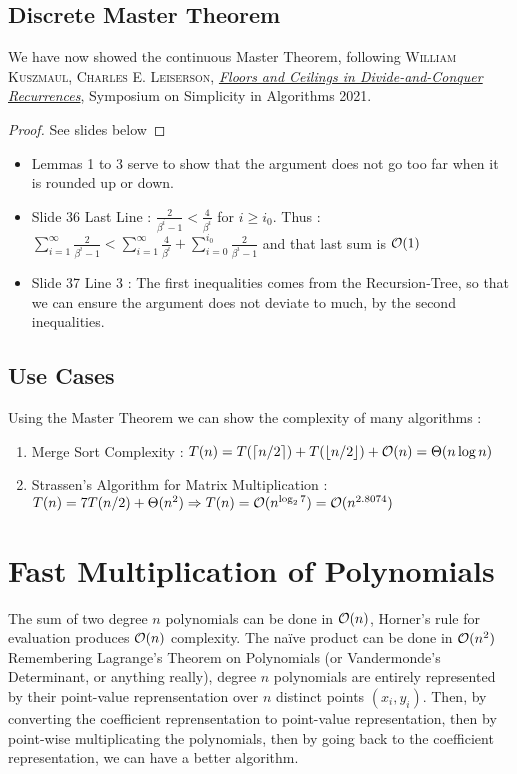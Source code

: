 \documentclass[12pt]{cours}
\begin{document}
\subsection{Discrete Master Theorem}
We have now showed the continuous Master Theorem, following \textsc{William Kuszmaul, Charles E. Leiserson}, \href{https://epubs.siam.org/doi/pdf/10.1137/1.9781611976496.15}{\textit{Floors and Ceilings in Divide-and-Conquer Recurrences}}, Symposium on Simplicity in Algorithms 2021.\\
\begin{proof}
    See slides below
    
\end{proof}
\begin{remark}
    \begin{itemize}
        \item Lemmas 1 to 3 serve to show that the argument does not go too far when it is rounded up or down.
        \item Slide 36 Last Line : $\frac{2}{\beta^{i} - 1} < \frac{4}{\beta^{i}}$ for $i \geq i_{0}$. Thus : $\sum_{i = 1}^{\infty} \frac{2}{\beta^{i} - 1} < \sum_{i = 1}^{\infty}\frac{4}{\beta^{i}} + \sum_{i = 0}^{i_0}\frac{2}{\beta^{i} - 1}$ and that last sum is $\mathcal{O}(1)$
        \item Slide 37 Line 3 : The first inequalities comes from the Recursion-Tree, so that we can ensure the argument does not deviate to much, by the second inequalities.
    \end{itemize}
\end{remark}
\subsection{Use Cases}
Using the Master Theorem we can show the complexity of many algorithms :
\begin{enumerate}
    \item Merge Sort Complexity : $T(n) = T(\lceil n/2 \rceil) + T(\lfloor n/2 \rfloor) + \mathcal{O}(n) = \Theta(n\log n)$
    \item Strassen's Algorithm for Matrix Multiplication : $T(n) = 7 T(n/2) + \Theta(n^{2}) \Rightarrow T(n) = \mathcal{O}(n^{\log_{2}7}) = \mathcal{O}(n^{2.8074})$
\end{enumerate}

\section{Fast Multiplication of Polynomials}
The sum of two degree $n$ polynomials can be done in $\mathcal{O}(n)$, Horner's rule for evaluation produces $\mathcal{O}(n)$ complexity. The naïve product can be done in $\mathcal{O}(n^2)$\\
Remembering Lagrange's Theorem on Polynomials (or Vandermonde's Determinant, or anything really), degree $n$ polynomials are entirely represented by their point-value reprensentation over $n$ distinct points $(x_{i}, y_{i})$.
Then, by converting the coefficient reprensentation to point-value representation, then by point-wise multiplicating the polynomials, then by going back to the coefficient representation, we can have a better algorithm.
\end{document}
